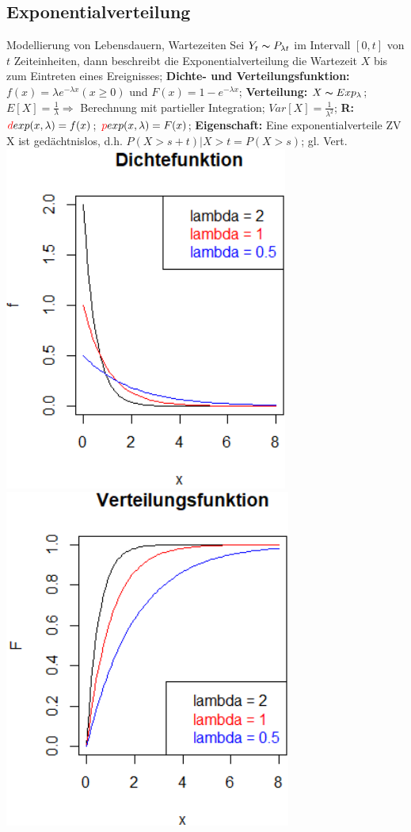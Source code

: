 \subsection{Exponentialverteilung}
Modellierung von Lebensdauern, Wartezeiten Sei $ Y_{t} \thicksim P_{\lambda t} $ im Intervall $ [0,t] $  von $ t $  Zeiteinheiten, dann beschreibt die Exponentialverteilung die Wartezeit $ X $ bis zum Eintreten eines Ereignisses; 
\textbf{Dichte- und Verteilungsfunktion:} 
$ f(x) = \lambda e^{-\lambda x} (x \ge 0) $ und 
$ F(x) = 1 - e^{-\lambda x}$; 
\textbf{Verteilung:} 
$ X \thicksim Exp_{\lambda}$; 
$ E[X] = \frac{1}{\lambda} \Rightarrow$ Berechnung mit partieller Integration; 
$ Var[X] = \frac{1}{\lambda^2}$;
\textbf{R:} 
$ \textcolor{red}{d}exp(x,\lambda) = f(x)$; 
$ \textcolor{red}{p}exp(x,\lambda) = F(x)$; 
\textbf{Eigenschaft:} 
Eine exponentialverteile ZV X ist gedächtnislos, d.h. 
$ P(X > s + t) | X > t = P( X > s)$; 
gl. Vert.
\includegraphics[scale=0.25]{./pic/ExponentialverteilungDichtefunktion.png}
\includegraphics[scale=0.25]{./pic/ExponentialverteilungVerteilungsfunktion.png}
